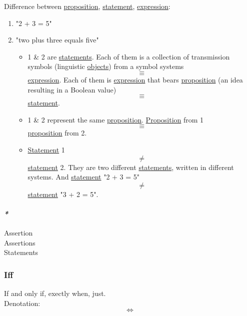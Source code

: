 \documentclass[11pt]{article}
\begin{document}
Difference between \hyperref[org78bac32]{proposition}, \hyperref[org0fdd00d]{statement}, \hyperref[org667db83]{expression}:\\
\begin{enumerate}
\item "2 + 3 = 5"\\
\item "two plus three equals five"\\

\begin{itemize}
\item 1 \& 2 are \hyperref[org3a604a1]{statements}. Each of them is a collection of transmission symbols (linguistic \hyperref[orge0f000f]{objects}) from a symbol systems $$ \equiv $$ \hyperref[org667db83]{expression}. Each of them is \hyperref[org667db83]{expression} that bears \hyperref[org78bac32]{proposition} (an idea resulting in a Boolean value) $$ \equiv $$ \hyperref[org0fdd00d]{statement}.\\

\item 1 \& 2 represent the same \hyperref[org78bac32]{proposition}. \hyperref[org78bac32]{Proposition} from 1 $$ \equiv $$ \hyperref[org78bac32]{proposition} from 2.\\

\item \hyperref[org0fdd00d]{Statement} 1 $$ \ne $$ \hyperref[org0fdd00d]{statement} 2. They are two different \hyperref[org3a604a1]{statements}, written in different systems. And \hyperref[org0fdd00d]{statement} "2 + 3 = 5" $$ \ne $$ \hyperref[org0fdd00d]{statement} "3 + 2 = 5".\\
\end{itemize}
\end{enumerate}

\paragraph{\emph{*}}
\label{sec:org0c14c95}

\label{org1dd3178}Assertion\\
\label{orgdeb8519}Assertions\\
\label{org3a604a1}Statements\\

\subsubsection{\label{org0c562ad}Iff}
\label{sec:org1ebb548}
If and only if, exectly when, just.\\
Denotation:\\
$$ \iff $$\\
\end{document}
